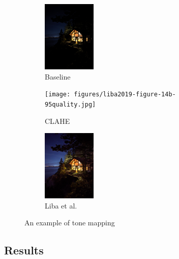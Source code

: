 \documentclass{sig-alternate}
\begin{document}

\begin{figure}
\centering
\begin{subfigure}{1in}
\centering
\includegraphics[width=1in]{figures/liba2019-figure-14a-95quality.jpg}
\caption{Baseline}
\label{fig:toneMapping:baseline}
\end{subfigure}
\begin{subfigure}{1in}
\centering
\texttt{[image: figures/liba2019-figure-14b-95quality.jpg]}
\caption{CLAHE}
\label{fig:toneMapping:clahe}
\end{subfigure}
\begin{subfigure}{1in}
\centering
\includegraphics[width=1in]{figures/liba2019-figure-14c-95quality.jpg}
\caption{Liba et al.}
\label{fig:toneMapping:liba}
\end{subfigure}

\caption{An example of tone mapping \cite{Liba2019}}

\label{fig:toneMapping}
\end{figure}


\subsection{Results}
\end{document}
